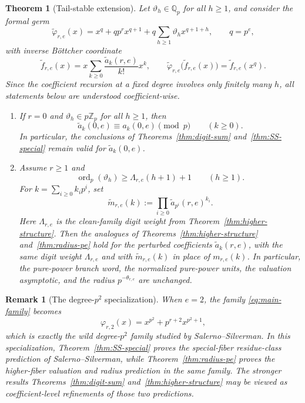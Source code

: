 \documentclass[11pt]{amsart}
\numberwithin{equation}{section}
\newtheorem{theorem}{Theorem}[section]
\newtheorem{remark}[remark]{Remark}
\DeclareMathOperator{\ordop}{ord}
\newcommand{\Qp}{\mathbb{Q}_p}
\newcommand{\Zp}{\mathbb{Z}_p}
\newcommand{\vp}{\ordop_p}
\begin{document}
\begin{theorem}[Tail-stable extension]\label{thm:tail-main}
Let $\vartheta_h\in\Qp$ for all $h\ge1$, and consider the formal germ
\[
        \widetilde\varphi_{r,e}(x)=x^q+qp^r x^{q+1}+q\sum_{h\ge1}\vartheta_hx^{q+1+h},
        \qquad q=p^e,
\]
with inverse B\"ottcher coordinate
\[
        \widetilde f_{r,e}(x)=x\sum_{k\ge0}\frac{\widetilde a_k(r,e)}{k!}x^k,
        \qquad
        \widetilde\varphi_{r,e}\bigl(\widetilde f_{r,e}(x)\bigr)=\widetilde f_{r,e}(x^q).
\]
Since the coefficient recursion at a fixed degree involves only finitely many $h$, all statements below are understood coefficient-wise.
\begin{enumerate}[label=\textup{(\alph*)},leftmargin=2.2em]
\item If $r=0$ and $\vartheta_h\in p\Zp$ for all $h\ge1$, then
\[
        \widetilde a_k(0,e)\equiv a_k(0,e)\pmod p
        \qquad (k\ge0).
\]
In particular, the conclusions of Theorems~\ref{thm:digit-sum} and~\ref{thm:SS-special} remain valid for $\widetilde a_k(0,e)$.
\item Assume $r\ge1$ and
\[
        \vp(\vartheta_h)\ge \Lambda_{r,e}(h+1)+1
        \qquad (h\ge1).
\]
For $k=\sum_{i\ge0}k_ip^i$, set
\[
        \widetilde m_{r,e}(k):=\prod_{i\ge0}\widetilde a_{p^i}(r,e)^{k_i}.
\]
Here $\Lambda_{r,e}$ is the clean-family digit weight from Theorem~\ref{thm:higher-structure}.  Then the analogues of Theorems~\ref{thm:higher-structure} and~\ref{thm:radius-pe} hold for the perturbed coefficients $\widetilde a_k(r,e)$, with the same digit weight $\Lambda_{r,e}$ and with $\widetilde m_{r,e}(k)$ in place of $m_{r,e}(k)$.  In particular, the pure-power branch word, the normalized pure-power units, the valuation asymptotic, and the radius $p^{-\theta_{r,e}}$ are unchanged.
\end{enumerate}
\end{theorem}

\begin{remark}[The degree-$p^2$ specialization]\label{rem:e2-ss-conjectures}
When $e=2$, the family \eqref{eq:main-family} becomes
\[
        \varphi_{r,2}(x)=x^{p^2}+p^{r+2}x^{p^2+1},
\]
which is exactly the wild degree-$p^2$ family studied by Salerno--Silverman.  In this specialization, Theorem~\ref{thm:SS-special} proves the special-fiber residue-class prediction of Salerno--Silverman, while Theorem~\ref{thm:radius-pe} proves the higher-fiber valuation and radius prediction in the same family.  The stronger results Theorems~\ref{thm:digit-sum} and~\ref{thm:higher-structure} may be viewed as coefficient-level refinements of those two predictions.
\end{remark}
\end{document}
